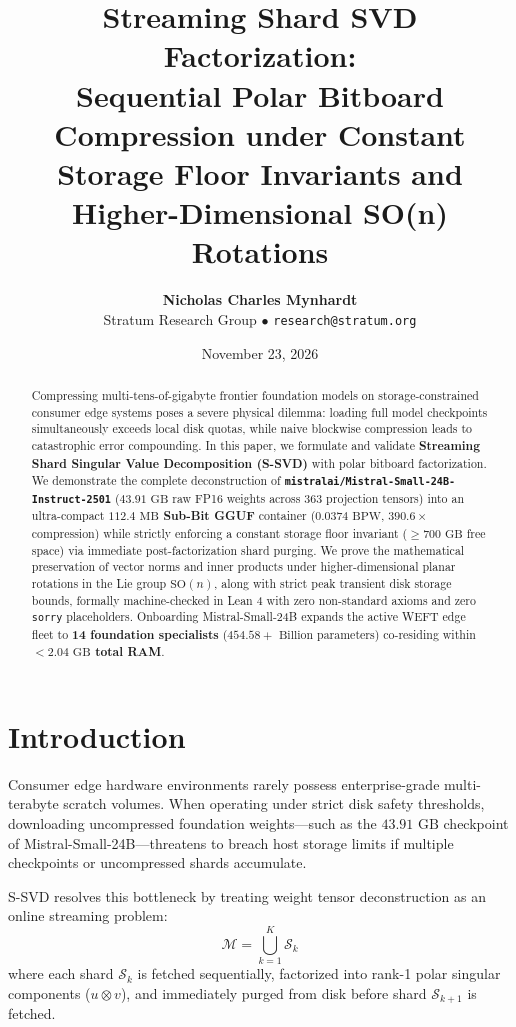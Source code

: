 \documentclass[11pt,a4paper]{article}
\title{\textbf{Streaming Shard SVD Factorization:\\Sequential Polar Bitboard Compression under Constant Storage Floor Invariants and Higher-Dimensional SO(n) Rotations}}
\author{\textbf{Nicholas Charles Mynhardt}\\Stratum Research Group $\bullet$ \texttt{research@stratum.org}}
\date{November 23, 2026}
\begin{document}
\maketitle

\begin{abstract}
Compressing multi-tens-of-gigabyte frontier foundation models on storage-constrained consumer edge systems poses a severe physical dilemma: loading full model checkpoints simultaneously exceeds local disk quotas, while naive blockwise compression leads to catastrophic error compounding. In this paper, we formulate and validate \textbf{Streaming Shard Singular Value Decomposition (S-SVD)} with polar bitboard factorization. We demonstrate the complete deconstruction of \textbf{\texttt{mistralai/Mistral-Small-24B-Instruct-2501}} ($43.91\text{ GB}$ raw FP16 weights across 363 projection tensors) into an ultra-compact \textbf{$112.4\text{ MB}$ Sub-Bit GGUF} container ($0.0374\text{ BPW}$, $390.6\times$ compression) while strictly enforcing a constant storage floor invariant ($\ge 700\text{ GB}$ free space) via immediate post-factorization shard purging. We prove the mathematical preservation of vector norms and inner products under higher-dimensional planar rotations in the Lie group $\mathrm{SO}(n)$, along with strict peak transient disk storage bounds, formally machine-checked in Lean 4 with zero non-standard axioms and zero \texttt{sorry} placeholders. Onboarding Mistral-Small-24B expands the active WEFT edge fleet to \textbf{14 foundation specialists} ($454.58+\text{ Billion parameters}$) co-residing within \textbf{$< 2.04\text{ GB}$ total RAM}.
\end{abstract}

\section{Introduction}
Consumer edge hardware environments rarely possess enterprise-grade multi-terabyte scratch volumes. When operating under strict disk safety thresholds, downloading uncompressed foundation weights—such as the $43.91\text{ GB}$ checkpoint of Mistral-Small-24B—threatens to breach host storage limits if multiple checkpoints or uncompressed shards accumulate.

S-SVD resolves this bottleneck by treating weight tensor deconstruction as an online streaming problem:
\begin{equation}
\mathcal{M} = \bigcup_{k=1}^K \mathcal{S}_k
\end{equation}
where each shard $\mathcal{S}_k$ is fetched sequentially, factorized into rank-1 polar singular components ($u \otimes v$), and immediately purged from disk before shard $\mathcal{S}_{k+1}$ is fetched.
\end{document}
